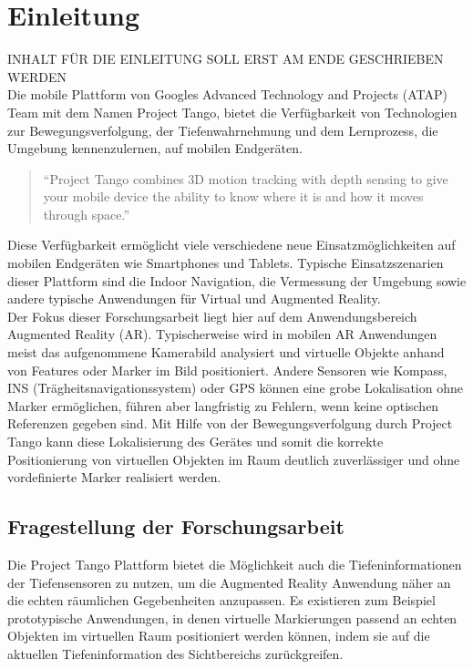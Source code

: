 \chapter{Einleitung}

INHALT FÜR DIE EINLEITUNG SOLL ERST AM ENDE GESCHRIEBEN WERDEN\\

Die mobile Plattform von Googles Advanced Technology and Projects (ATAP) Team mit dem Namen Project Tango, bietet die Verfügbarkeit von Technologien zur Bewegungsverfolgung, der Tiefenwahrnehmung und dem Lernprozess, die Umgebung kennenzulernen, auf mobilen Endgeräten. 

\begin{quotation}
\enquote{Project Tango combines 3D motion tracking with depth sensing to give your mobile device the ability to know where it is and how it moves through space.}  \citep{Proje19:online}
\end{quotation}

Diese Verfügbarkeit ermöglicht viele verschiedene neue Einsatzmöglichkeiten auf mobilen Endgeräten wie Smartphones und Tablets. Typische Einsatzszenarien dieser Plattform sind die Indoor Navigation, die Vermessung der Umgebung sowie andere typische Anwendungen für Virtual und Augmented Reality. \\

Der Fokus dieser Forschungsarbeit liegt hier auf dem Anwendungsbereich Augmented Reality (AR). Typischerweise wird in mobilen AR Anwendungen meist das aufgenommene Kamerabild analysiert und virtuelle Objekte anhand von Features oder Marker im Bild positioniert. Andere Sensoren wie Kompass, INS (Trägheitsnavigationssystem) oder GPS können eine grobe Lokalisation ohne Marker ermöglichen, führen aber langfristig zu Fehlern, wenn keine optischen Referenzen gegeben sind. Mit Hilfe von der Bewegungsverfolgung durch Project Tango kann diese Lokalisierung des Gerätes und somit die korrekte Positionierung von virtuellen Objekten im Raum deutlich zuverlässiger und ohne vordefinierte Marker realisiert werden. 

\section{Fragestellung der Forschungsarbeit}

Die Project Tango Plattform bietet die Möglichkeit auch die Tiefeninformationen der Tiefensensoren zu nutzen, um die Augmented Reality Anwendung näher an die echten räumlichen Gegebenheiten anzupassen. Es existieren zum Beispiel prototypische Anwendungen, in denen virtuelle Markierungen passend an echten Objekten im virtuellen Raum positioniert werden können, indem sie auf die aktuellen Tiefeninformation des Sichtbereichs zurückgreifen.\\

